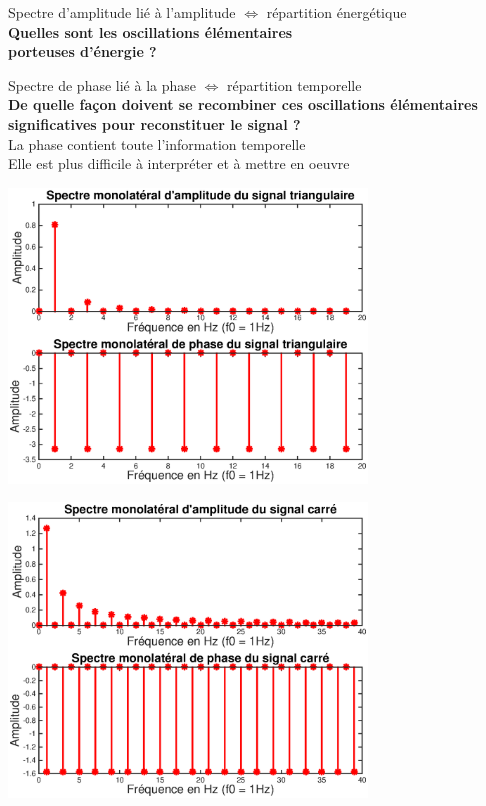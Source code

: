 \documentclass[a4paper,11pt]{beamer}
\begin{document}
\begin{frame}
\begin{alertblock}{Spectre d'amplitude}
\center
lié à l'amplitude $\Leftrightarrow$ répartition énergétique\\
\alert{\textbf{Quelles sont les oscillations élémentaires\\ porteuses d'énergie
?}}
\end{alertblock}
\pause
\begin{alertblock}{Spectre de phase}
\center
lié à la phase $\Leftrightarrow$ répartition temporelle\\
\alert{\textbf{De quelle façon doivent se recombiner ces oscillations
élémentaires significatives pour reconstituer le signal ?}}\\
La phase contient toute l'information temporelle\\
Elle est plus difficile à interpréter et à mettre en oeuvre
\end{alertblock}
\end{frame}

\begin{frame}
\center
\includegraphics [width=3.75in]{images/RepSpectrale_01.eps}
\end{frame}

\begin{frame}
\center
\includegraphics [width=3.75in]{images/RepSpectrale_02.eps} 
\end{frame}
\end{document}
